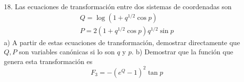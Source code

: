 18. Las ecuaciones de transformación entre dos sistemas de coordenadas son
$$
\begin{gathered}
Q=\log \left(1+q^{1 / 2} \cos p\right) \\
P=2\left(1+q^{1 / 2} \cos p\right) q^{1 / 2} \sin p
\end{gathered}
$$
a) A partir de estas ecuaciones de transformación, demostrar directamente que $Q, P$ son variables canónicas si lo son $q$ y $p$.
b) Demostrar que la función que genera esta transformación es
$$
F_3=-\left(e^Q-1\right)^2 \tan p
$$